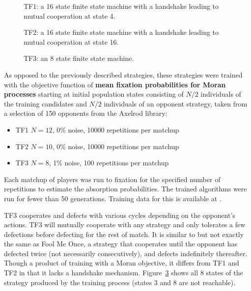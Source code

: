 \documentclass[10pt,journal]{IEEEtran}
\begin{document}
\begin{figure}[!hbtp]
    \centering
    \scalebox{.7}{}
    \caption{TF1: a 16 state finite state machine with a handshake leading to
    mutual cooperation at state 4.}
    \label{fig:tf1}
\end{figure}


\begin{figure}[!hbtp]
    \centering
    \scalebox{.7}{}
    \caption{TF2: a 16 state finite state machine with a handshake leading to
    mutual cooperation at state 16.}
    \label{fig:tf2}
\end{figure}


\begin{figure}[!hbtp]
    \centering
    
    \caption{TF3: an 8 state finite state machine.}
    \label{fig:tf3}
\end{figure}

As opposed to the previously described strategies, these strategies were trained
with the objective function of \textbf{mean fixation probabilities for Moran
processes} starting at initial population states consisting of \(N/2\)
individuals of the training candidates and \(N/2\) individuals of an opponent
strategy, taken from a selection of 150 opponents from the Axelrod library:

\begin{itemize}
	\item TF1 \(N=12\), 0\% noise, 10000 repetitions per matchup
	\item TF2 \(N=10\), 0\% noise, 10000 repetitions per matchup
	\item TF3 \(N=8\), 1\% noise, 100 repetitions per matchup
\end{itemize}

Each matchup of players was run to fixation for the specified number of
repetitions to estimate the absorption probabilities. The trained algorithms
were run for fewer than 50 generations. Training data for this is available at
\cite{data}.

TF3 cooperates and defects with
various cycles depending on the opponent's actions. TF3 will mutually
cooperate with any strategy and only tolerates a few defections before
defecting for the rest of match. It is similar to but not exactly the same as
Fool Me Once, a strategy that cooperates until the opponent has defected twice
(not necessarily consecutively), and defects indefinitely thereafter. Though a
product of training with a Moran objective, it differs from TF1 and TF2
in that it lacks a handshake mechanism. Figure~\ref{fig:tf3} shows
all 8 states of the strategy produced by the training process (states 3 and 8
are not reachable).
\end{document}

